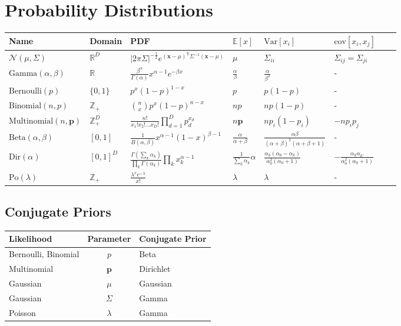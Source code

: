 \documentclass[a4paper]{article}
\begin{document}
\section{Probability Distributions}
\begin{table}[H]
\centering
\begin{tabular}{l|l|l|l|l|l|l|l}
Name & Domain & PDF & $\mathbb{E}[x]$ & $\textrm{Var}[x_i]$ & $\textrm{cov}[x_i,x_j]$ \\\hline
$\mathcal{N}(\mu,\Sigma)$ & $\mathbb{R}^D$ & $|2\pi\Sigma|^{-\frac{1}{2}}e^{(\mathbf{x} - \mu)^\textrm{T}\Sigma^{-1}(\mathbf{x}-\mu)}$ & $\mu$ & $\Sigma_{ii}$ & $\Sigma_{ij} = \Sigma_{ji}$ \\
$\textrm{Gamma}(\alpha,\beta)$ & $\mathbb{R}$ & $\frac{\beta^\alpha}{\Gamma(\alpha)} x^{\alpha - 1}e^{-\beta x}$ & $\frac{\alpha}{\beta}$ & $\frac{\alpha}{\beta^2}$ & - \\
$\textrm{Bernoulli}(p)$ & $\{0,1\}$ & $p^x(1-p)^{1-x}$ & $p$ & $p(1-p)$ & - \\
$\textrm{Binomial}(n,p)$ & $\mathbb{Z}_+$ & $\binom{n}{x}p^x(1-p)^{n-x}$ & $np$ & $np(1-p)$ & - \\
$\textrm{Multinomial}(n,\mathbf{p})$ & $\mathbb{Z}_+^D$ & $\frac{n!}{x_1!x_2!\ldots x_D!} \prod_{d=1}^D p_d^{x_d}$ & $n \mathbf{p}$ & $np_i(1-p_i)$ & $-np_ip_j$ \\
$\textrm{Beta}(\alpha,\beta)$ & $[0,1]$ & $\frac{1}{B(\alpha,\beta)} x^{\alpha - 1}(1-x)^{\beta-1}$ & $\frac{\alpha}{\alpha + \beta}$ & $\frac{\alpha\beta}{(\alpha+\beta)^2(\alpha+\beta+1)}$ & - \\
$\textrm{Dir}(\alpha)$ & $[0,1]^D$ & $\frac{\Gamma(\sum_k\alpha_k)}{\prod_k\Gamma(\alpha_k)} \prod_k x_k^{\alpha - 1}$ & $\frac{1}{\sum_k \alpha_k}\alpha$ & $\frac{\alpha_k(\alpha_0-\alpha_k)}{\alpha_0^2(\alpha_0+1)}$ & $-\frac{\alpha_k\alpha_{k'}}{\alpha_0^2(\alpha_0+1)}$ \\
$\textrm{Po}(\lambda)$ & $\mathbb{Z}_+$ & $\frac{\lambda^x e^{-\lambda}}{x!}$ & $\lambda$ & $\lambda$ & - \\
\end{tabular}
\end{table}

\subsection{Conjugate Priors}
\begin{table}[H]
\centering
\begin{tabular}{l|c|l}
Likelihood & Parameter & Conjugate Prior \\\hline
Bernoulli, Binomial & $p$ & Beta \\
Multinomial & $\mathbf{p}$ & Dirichlet \\
Gaussian & $\mu$ & Gaussian \\
Gaussian & $\Sigma$ & Gamma \\
Poisson & $\lambda$ & Gamma
\end{tabular}
\end{table}
\end{document}
